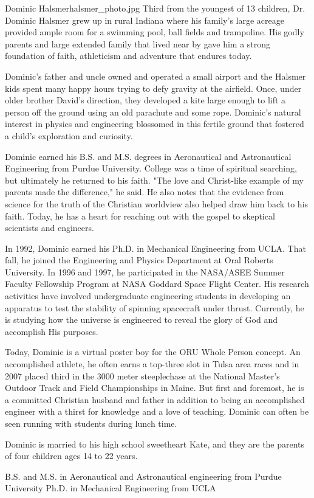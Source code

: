 \begin{authorbio}{Dominic Halsmer}{halsmer_photo.jpg}
Third from the youngest of 13 children, Dr. Dominic Halsmer grew up in rural Indiana where his family's large acreage provided ample room for a swimming pool, ball fields and trampoline. His godly parents and large extended family that lived near by gave him a strong foundation of faith, athleticism and adventure that endures today.

Dominic's father and uncle owned and operated a small airport and the Halsmer kids spent many happy hours trying to defy gravity at the airfield. Once, under older brother David's direction, they developed a kite large enough to lift a person off the ground using an old parachute and some rope. Dominic's natural interest in physics and engineering blossomed in this fertile ground that fostered a child's exploration and curiosity.

Dominic earned his B.S. and M.S. degrees in Aeronautical and Astronautical Engineering from Purdue University. College was a time of spiritual searching, but ultimately he returned to his faith. "The love and Christ-like example of my parents made the difference," he said. He also notes that the evidence from science for the truth of the Christian worldview also helped draw him back to his faith. Today, he has a heart for reaching out with the gospel to skeptical scientists and engineers.

In 1992, Dominic earned his Ph.D. in Mechanical Engineering from UCLA. That fall, he joined the Engineering and Physics Department at Oral Roberts University. In 1996 and 1997, he participated in the NASA/ASEE Summer Faculty Fellowship Program at NASA Goddard Space Flight Center. His research activities have involved undergraduate engineering students in developing an apparatus to test the stability of spinning spacecraft under thrust. Currently, he is studying how the universe is engineered to reveal the glory of God and accomplish His purposes.

Today, Dominic is a virtual poster boy for the ORU Whole Person concept. An accomplished athlete, he often earns a top-three slot in Tulsa area races and in 2007 placed third in the 3000 meter steeplechase at the National Master's Outdoor Track and Field Championships in Maine. But first and foremost, he is a committed Christian husband and father in addition to being an accomplished engineer with a thirst for knowledge and a love of teaching.  Dominic can often be seen running with students during lunch time.

Dominic is married to his high school sweetheart Kate, and they are the parents of four children ages 14 to 22 years.

B.S. and M.S. in Aeronautical and Astronautical engineering from Purdue University
Ph.D. in Mechanical Engineering from UCLA
\end{authorbio}


